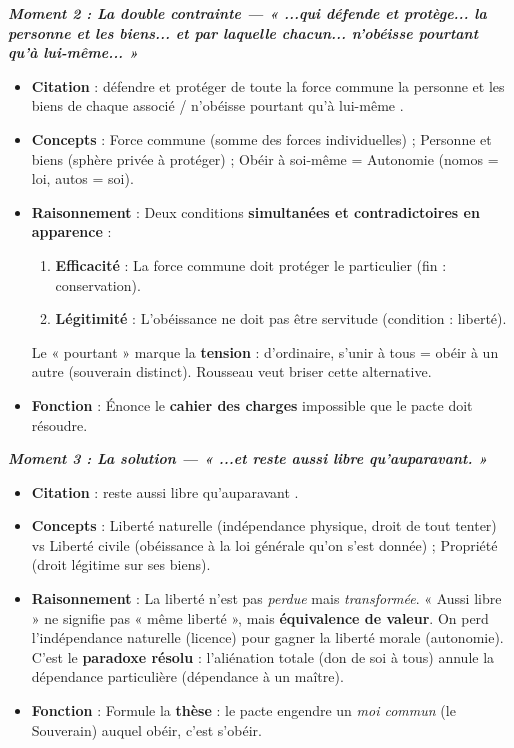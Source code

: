 \documentclass[11pt]{article}
\newcommand{\cle}[1]{{\popxbold\color{popdark}#1}}
\begin{document}
\begin{exoresolu}
\emph{\textbf{Moment 2 : La double contrainte — « ...qui défende et protège... la personne et les biens... et par laquelle chacun... n'obéisse pourtant qu'à lui-même... »}}
\begin{itemize}
    \item \textbf{Citation} : \guillemotleft défendre et protéger de toute la force commune la personne et les biens de chaque associé \guillemotright / \guillemotleft n'obéisse pourtant qu'à lui-même \guillemotright.
    \item \textbf{Concepts} : \cle{Force commune} (somme des forces individuelles) ; \cle{Personne et biens} (sphère privée à protéger) ; \cle{Obéir à soi-même} = \cle{Autonomie} (nomos = loi, autos = soi).
    \item \textbf{Raisonnement} : Deux conditions \textbf{simultanées et contradictoires en apparence} :
    \begin{enumerate}
        \item \textbf{Efficacité} : La force commune doit protéger le particulier (fin : conservation).
        \item \textbf{Légitimité} : L'obéissance ne doit pas être servitude (condition : liberté).
    \end{enumerate}
    Le « pourtant » marque la \textbf{tension} : d'ordinaire, s'unir à tous = obéir à un autre (souverain distinct). Rousseau veut briser cette alternative.
    \item \textbf{Fonction} : Énonce le \textbf{cahier des charges} impossible que le pacte doit résoudre.
\end{itemize}

\emph{\textbf{Moment 3 : La solution — « ...et reste aussi libre qu'auparavant. »}}
\begin{itemize}
    \item \textbf{Citation} : \guillemotleft reste aussi libre qu'auparavant \guillemotright.
    \item \textbf{Concepts} : \cle{Liberté naturelle} (indépendance physique, droit de tout tenter) vs \cle{Liberté civile} (obéissance à la loi générale qu'on s'est donnée) ; \cle{Propriété} (droit légitime sur ses biens).
    \item \textbf{Raisonnement} : La liberté n'est pas \emph{perdue} mais \emph{transformée}. « Aussi libre » ne signifie pas « même liberté », mais \textbf{équivalence de valeur}. On perd l'indépendance naturelle (licence) pour gagner la liberté morale (autonomie). C'est le \textbf{paradoxe résolu} : l'aliénation totale (don de soi à tous) annule la dépendance particulière (dépendance à un maître).
    \item \textbf{Fonction} : Formule la \textbf{thèse} : le pacte engendre un \emph{moi commun} (le Souverain) auquel obéir, c'est s'obéir.
\end{itemize}


\end{exoresolu}
\end{document}
